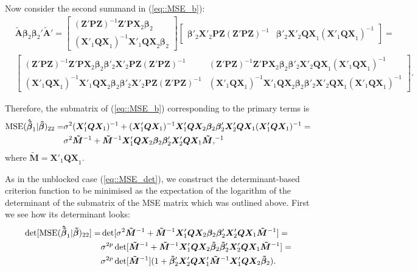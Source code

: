 Now consider the second summand in (\ref{eq::MSE_b}):
\begin{align*}
&\bm{\tilde{A}}\bm{\beta}_2\bm{\beta}_2'\bm{\tilde{A}}'=
\begin{bmatrix}
(\bm{Z}'\bm{PZ})^{-1}\bm{Z}'\bm{PX}_{2}\bm{\beta}_2 \\
(\bm{X}'_{1}\bm{QX}_{1})^{-1}\bm{X}'_{1}\bm{QX}_{2}\bm{\beta}_2
\end{bmatrix}
\begin{bmatrix}
\bm{\beta}'_2\bm{X}'_{2}\bm{PZ}(\bm{Z}'\bm{PZ})^{-1} & \bm{\beta}'_2\bm{X}'_{2}\bm{QX}_{1}(\bm{X}'_{1}\bm{QX}_{1})^{-1}
\end{bmatrix}=\\
&\begin{bmatrix}
(\bm{Z}'\bm{PZ})^{-1}\bm{Z}'\bm{PX}_{2}\bm{\beta}_2\bm{\beta}'_2\bm{X}'_{2}\bm{PZ}(\bm{Z}'\bm{PZ})^{-1} & (\bm{Z}'\bm{PZ})^{-1}\bm{Z}'\bm{PX}_{2}\bm{\beta}_2\bm{\beta}'_2\bm{X}'_{2}\bm{QX}_{1}(\bm{X}'_{1}\bm{QX}_{1})^{-1} \\
(\bm{X}'_{1}\bm{QX}_{1})^{-1}\bm{X}'_{1}\bm{QX}_{2}\bm{\beta}_2\bm{\beta}'_2\bm{X}'_{2}\bm{PZ}(\bm{Z}'\bm{PZ})^{-1} & (\bm{X}'_{1}\bm{QX}_{1})^{-1}\bm{X}'_{1}\bm{QX}_{2}\bm{\beta}_2\bm{\beta}'_2\bm{X}'_{2}\bm{QX}_{1}(\bm{X}'_{1}\bm{QX}_{1})^{-1}
\end{bmatrix}.
\end{align*}

Therefore, the submatrix of (\ref{eq::MSE_b}) corresponding to the primary terms is
\begin{align}
\label{eq::mesb_submatrix}
\mbox{MSE}(\bm{\hat{\tilde{\beta}}}_1|\bm{\tilde{\beta}})_{22}=&\sigma^2(\bm{X}'_{1}\bm{QX}_{1})^{-1}+(\bm{X}'_{1}\bm{QX}_{1})^{-1}\bm{X}'_{1}\bm{QX}_{2}\bm{\beta}_2\bm{\beta}'_2\bm{X}'_{2}\bm{QX}_{1}(\bm{X}'_{1}\bm{QX}_{1})^{-1}=\notag\\& \sigma^2\bm{\tilde{M}}^{-1}+\bm{\tilde{M}}^{-1}\bm{X}'_{1}\bm{QX}_{2}\bm{\beta}_2\bm{\beta}'_2\bm{X}'_{2}\bm{QX}_{1}\bm{\tilde{M}},^{-1}
\end{align}
where $\bm{\tilde{M}}=\bm{X}'_{1}\bm{QX}_{1}.$

As in the unblocked case (\ref{eq::MSE_det}), we construct the determinant-based criterion function to be minimised as the expectation of the logarithm of the determinant of the submatrix of the MSE matrix which was outlined above. First we see how its determinant looks:
\begin{align}
\label{eq::MSE_B_det}
\det[\mbox{MSE}(\bm{\hat{\tilde{\beta}}}_1|\bm{\tilde{\beta}})_{22}]=&\det[\sigma^2\bm{\tilde{M}}^{-1}+\bm{\tilde{M}}^{-1}\bm{X}'_{1}\bm{QX}_{2}\bm{\beta}_2\bm{\beta}'_2\bm{X}'_{2}\bm{QX}_{1}\bm{\tilde{M}}^{-1}]=\notag\\& \sigma^{2p}\det[\bm{\tilde{M}}^{-1}+\bm{\tilde{M}}^{-1}\bm{X}'_{1}\bm{QX}_{2}\bm{\tilde{\beta}}_2\bm{\tilde{\beta}}'_2\bm{X}'_{2}\bm{QX}_{1}\bm{\tilde{M}}^{-1}]=\notag\\& \sigma^{2p}\det[\bm{\tilde{M}}^{-1}](1+\bm{\tilde{\beta}}'_2\bm{X}'_{2}\bm{QX}'_{1}\bm{\tilde{M}}^{-1}\bm{X}'_{1}\bm{QX}_{2}\bm{\tilde{\beta}}_2).
\end{align}

